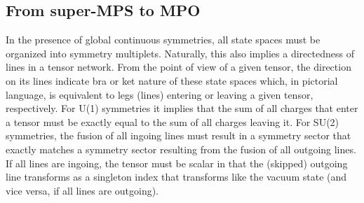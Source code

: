 \documentclass[aps,prx,twocolumn,showpacs,psfig,superscriptaddress,longbibliography]{revtex4-1}
\begin{document}
\subsection{From super-MPS to MPO}

In the presence of global continuous symmetries, all state spaces
must be organized into symmetry multiplets. Naturally, this also
implies a directedness of lines in a tensor network.  From the point
of view of a given tensor, the direction on its lines indicate bra
or ket nature of these state spaces which, in pictorial language, is
equivalent to legs (lines) entering or leaving a given tensor,
respectively.  For U(1) symmetries it implies that the sum of all
charges that enter a tensor must be exactly equal to the sum of all
charges leaving it.  For SU(2) symmetries, the fusion of all ingoing
lines must result in a symmetry sector that exactly matches a
symmetry sector resulting from the fusion of all outgoing lines.  If
all lines are ingoing, the tensor must be scalar in that the
(skipped) outgoing line transforms as a singleton index that
transforms like the vacuum state (and vice versa, if all lines are
outgoing).
\end{document}
